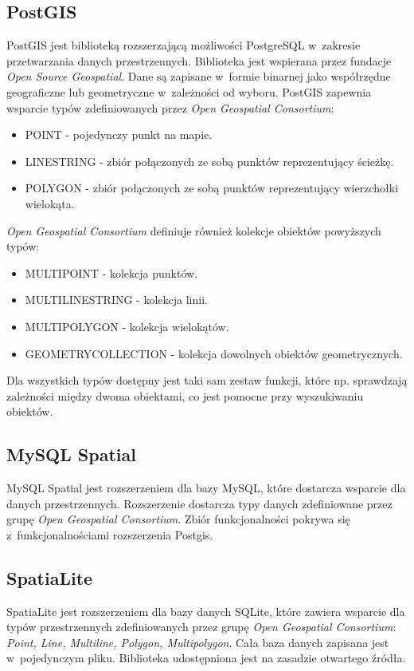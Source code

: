 \documentclass[printmode]{mgr}
\begin{document}
\subsection{PostGIS}
PostGIS jest biblioteką rozszerzającą możliwości PostgreSQL w~zakresie przetwarzania danych przestrzennych. Biblioteka jest wspierana przez fundacje \textit{Open Source Geospatial}. \cite{doc_postgis} Dane są zapisane w~formie binarnej jako współrzędne geograficzne lub geometryczne w~zależności od wyboru. PostGIS zapewnia wsparcie typów zdefiniowanych przez \textit{Open Geospatial Consortium}:
\begin{itemize}
  \item POINT - pojedynczy punkt na mapie.
  \item LINESTRING - zbiór połączonych ze sobą punktów reprezentujący ścieżkę.
  \item POLYGON - zbiór połączonych ze sobą punktów reprezentujący wierzchołki wielokąta.
\end{itemize} 
\textit{Open Geospatial Consortium} definiuje również kolekcje obiektów powyższych typów:
\begin{itemize}
  \item MULTIPOINT - kolekcja punktów.
  \item MULTILINESTRING - kolekcja linii.
  \item MULTIPOLYGON - kolekcja wielokątów.
  \item GEOMETRYCOLLECTION - kolekcja dowolnych obiektów geometrycznych.
\end{itemize}
Dla wszystkich typów dostępny jest taki sam zestaw funkcji, które np. sprawdzają zależności między dwoma obiektami, co jest pomocne przy wyszukiwaniu obiektów.

\subsection{MySQL Spatial}
MySQL Spatial jest rozszerzeniem dla bazy MySQL, które dostarcza wsparcie dla danych przestrzennych. Rozszerzenie dostarcza typy danych zdefiniowane przez grupę \textit{Open Geospatial Consortium}. \cite{doc_mysql} Zbiór funkcjonalności pokrywa się z~funkcjonalnościami rozszerzenia Postgis.
\subsection{SpatiaLite}
SpatiaLite jest rozszerzeniem dla bazy danych SQLite, które zawiera wsparcie dla typów przestrzennych zdefiniowanych przez grupę \textit{Open Geospatial Consortium}\cite{doc_spatialite}: \textit{Point, Line, Multiline, Polygon, Multipolygon}. Cała baza danych zapisana jest w~pojedynczym pliku. Biblioteka udostępniona jest na zasadzie otwartego źródła.
\end{document}
